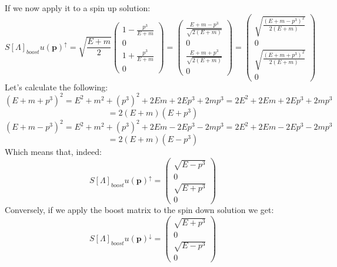 \documentclass[12pt]{article}
\begin{document}
If we now apply it to a spin up solution:
\[
    S[\Lambda]_{boost} u(\mathbf{p})^{\uparrow} = \sqrt{\frac{E + m}{2}}\begin{pmatrix}  1-\frac{p^3}{E+m} \\
                            0                 \\
                            1+\frac{p^3}{E+m} \\
                            0
                        \end{pmatrix}
                        = \begin{pmatrix}  \frac{E+m-p^3}{\sqrt{2(E+m)}} \\
                            0                 \\
                            \frac{E+m+p^3}{\sqrt{2(E+m)}} \\
                            0
                            \end{pmatrix} = \begin{pmatrix}  \sqrt{\frac{(E+m-p^3)^2}{2(E+m)}} \\
                            0                 \\
                            \sqrt{\frac{(E+m+p^3)^2}{2(E+m)}} \\
                            0
                        \end{pmatrix}
\]
Let's calculate the following:
\[
    (E+m+p^3)^2 = E^2+m^2+(p^3)^2+2Em+2Ep^3+2mp^3 = 2E^2+2Em+2Ep^3+2mp^3
\]
\[
    = 2(E + m)(E+p^3)
\]
\[
    (E+m-p^3)^2 = E^2+m^2+(p^3)^2+2Em-2Ep^3-2mp^3 = 2E^2+2Em-2Ep^3-2mp^3
\]
\[
    = 2(E + m)(E-p^3)
\]
Which means that, indeed:
\[
    S[\Lambda]_{boost} u(\mathbf{p})^{\uparrow} = \begin{pmatrix} \sqrt{E-p^3} \\
                            0                 \\
                            \sqrt{E+p^3} \\
                            0
                        \end{pmatrix}
\]
Conversely, if we apply the boost matrix to the spin down solution we get:
\[
S[\Lambda]_{boost} u(\mathbf{p})^{\downarrow} = \begin{pmatrix} \sqrt{E+p^3} \\
                            0                 \\
                            \sqrt{E-p^3} \\
                            0
                        \end{pmatrix}
\]
\end{document}
